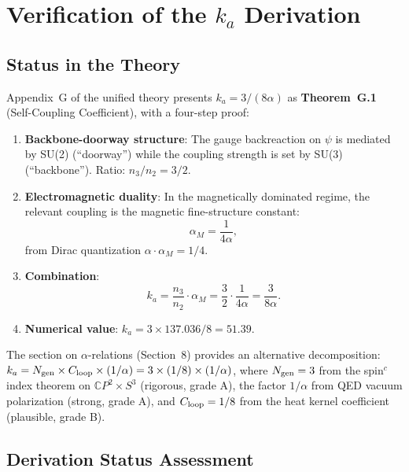 \documentclass[12pt,a4paper]{article}
\theoremstyle{remark}
\begin{document}
\section{Verification of the $k_a$ Derivation}

\subsection{Status in the Theory}

Appendix~G of the unified theory presents $k_a = 3/(8\alpha)$ as
\textbf{Theorem~G.1} (Self-Coupling Coefficient), with a four-step proof:

\begin{enumerate}
\item \textbf{Backbone-doorway structure}: The gauge backreaction on $\psi$
  is mediated by SU(2) (``doorway'') while the coupling strength is set by
  SU(3) (``backbone''). Ratio: $n_3/n_2 = 3/2$.

\item \textbf{Electromagnetic duality}: In the magnetically dominated regime,
  the relevant coupling is the magnetic fine-structure constant:
  \begin{equation}
  \alpha_M = \frac{1}{4\alpha},
  \end{equation}
  from Dirac quantization $\alpha \cdot \alpha_M = 1/4$.

\item \textbf{Combination}:
  \begin{equation}
  k_a = \frac{n_3}{n_2} \cdot \alpha_M = \frac{3}{2} \cdot \frac{1}{4\alpha}
  = \frac{3}{8\alpha}.
  \end{equation}

\item \textbf{Numerical value}: $k_a = 3 \times 137.036 / 8 = 51.39$.
\end{enumerate}

The section on $\alpha$-relations (Section~8) provides an alternative
decomposition: $k_a = N_{\rm gen} \times C_{\rm loop} \times (1/\alpha)
= 3 \times (1/8) \times (1/\alpha)$, where $N_{\rm gen} = 3$ from the
spin$^c$ index theorem on $\mathbb{C}P^2 \times S^3$ (rigorous, grade A),
the factor $1/\alpha$ from QED vacuum polarization (strong, grade A), and
$C_{\rm loop} = 1/8$ from the heat kernel coefficient (plausible, grade B).

\subsection{Derivation Status Assessment}
\end{document}
